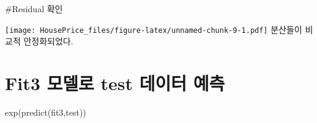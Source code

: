 \documentclass[
]{article}
\newenvironment{Shaded}{\begin{snugshade}}{\end{snugshade}}
\newcommand{\FunctionTok}[1]{\textcolor[rgb]{0.00,0.00,0.00}{#1}}
\newcommand{\NormalTok}[1]{#1}
\newcommand{\SpecialCharTok}[1]{\textcolor[rgb]{0.00,0.00,0.00}{#1}}
\begin{document}
\#Residual 확인

\begin{Shaded}
\end{Shaded}

\texttt{[image: HousePrice\_files/figure-latex/unnamed-chunk-9-1.pdf]}
분산들이 비교적 안정화되었다.

\hypertarget{fit3-uxbaa8uxb378uxb85c-test-uxb370uxc774uxd130-uxc608uxce21}{%
\section{Fit3 모델로 test 데이터
예측}\label{fit3-uxbaa8uxb378uxb85c-test-uxb370uxc774uxd130-uxc608uxce21}}

\begin{Shaded}
\begin{Highlighting}[]
\FunctionTok{exp}\NormalTok{(}\FunctionTok{predict}\NormalTok{(fit3,test))}
\end{Highlighting}
\end{Shaded}
\end{document}
